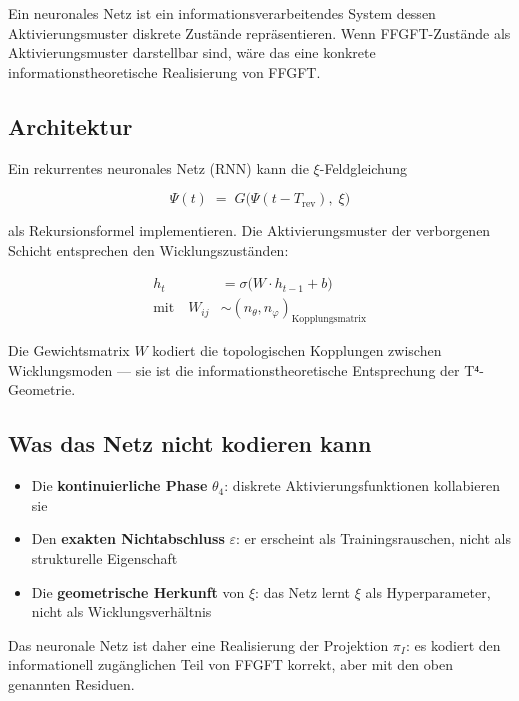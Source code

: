 Ein neuronales Netz ist ein informationsverarbeitendes System dessen
Aktivierungsmuster diskrete Zustände repräsentieren. Wenn FFGFT-Zustände
als Aktivierungsmuster darstellbar sind, wäre das eine konkrete
informationstheoretische Realisierung von FFGFT.

\subsection{Architektur}

Ein rekurrentes neuronales Netz (RNN) kann die $\xi$-Feldgleichung

\begin{equation}
  \Psi(t) \;=\; G\bigl(\Psi(t - T_\text{rev}),\; \xi\bigr)
  \tag{243.4}
\end{equation}

als Rekursionsformel implementieren. Die Aktivierungsmuster der
verborgenen Schicht entsprechen den Wicklungszuständen:

\begin{align}
  h_t &= \sigma\bigl(W \cdot h_{t-1} + b\bigr) \tag{243.5} \\
  \text{mit}\quad W_{ij} &\sim (n_\theta, n_\varphi)_\text{Kopplungsmatrix}
  \tag{243.6}
\end{align}

Die Gewichtsmatrix $W$ kodiert die topologischen Kopplungen zwischen
Wicklungsmoden --- sie ist die informationstheoretische Entsprechung
der T⁴-Geometrie.

\subsection{Was das Netz nicht kodieren kann}

\begin{itemize}
  \item Die \textbf{kontinuierliche Phase} $\theta_4$: diskrete
        Aktivierungsfunktionen kollabieren sie
  \item Den \textbf{exakten Nichtabschluss} $\varepsilon$: er
        erscheint als Trainingsrauschen, nicht als strukturelle Eigenschaft
  \item Die \textbf{geometrische Herkunft} von $\xi$: das Netz lernt
        $\xi$ als Hyperparameter, nicht als Wicklungsverhältnis
\end{itemize}

Das neuronale Netz ist daher eine Realisierung der Projektion $\pi_I$:
es kodiert den informationell zugänglichen Teil von FFGFT korrekt,
aber mit den oben genannten Residuen.


